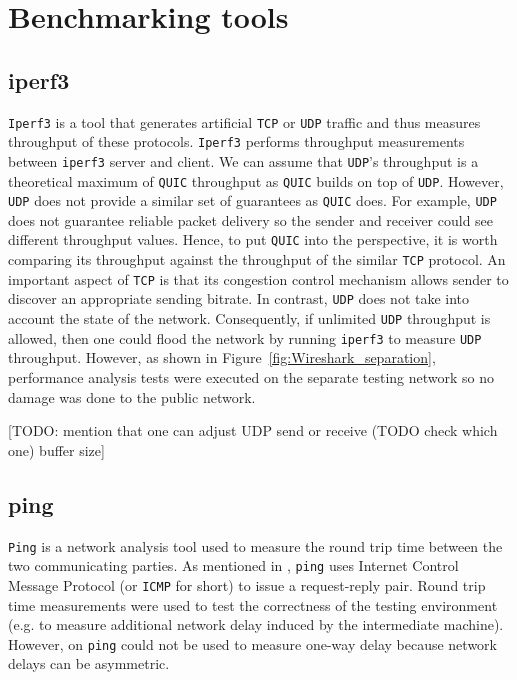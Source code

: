 \documentclass[12pt,a4paper,twoside,openright]{report}
\begin{document}
\section{Benchmarking tools}
\subsection{iperf3}
\texttt{Iperf3} is a tool that generates artificial \texttt{TCP} or \texttt{UDP} traffic and thus measures throughput of these protocols.
\texttt{Iperf3} performs throughput measurements between \texttt{iperf3} server and client.
We can assume that \texttt{UDP}'s throughput is a theoretical maximum of \texttt{QUIC} throughput as \texttt{QUIC} builds on top of \texttt{UDP}.
However, \texttt{UDP} does not provide a similar set of guarantees as \texttt{QUIC} does.
For example, \texttt{UDP} does not guarantee reliable packet delivery so the sender and receiver could see different throughput values.
Hence, to put \texttt{QUIC} into the perspective, it is worth comparing its throughput against the throughput of the similar \texttt{TCP} protocol.
An important aspect of \texttt{TCP} is that its congestion control mechanism allows sender to discover an appropriate sending bitrate.
In contrast, \texttt{UDP} does not take into account the state of the network.
Consequently, if unlimited \texttt{UDP} throughput is allowed, then one could flood the network by running \texttt{iperf3} to measure \texttt{UDP} throughput.
However, as shown in Figure~\ref{fig:Wireshark_separation}, performance analysis tests were executed on the separate testing network so no damage was done to the public network.


[TODO: mention that one can adjust UDP send or receive (TODO check which one) buffer size]



\subsection{ping}
\texttt{Ping} is a network analysis tool used to measure the round trip time between the two communicating parties.
As mentioned in \cite{internet-control-message-protocol-icmp}, \texttt{ping} uses Internet Control Message Protocol (or \texttt{ICMP} for short) to issue a request-reply pair.
Round trip time measurements were used to test the correctness of the testing environment (e.g. to measure additional network delay induced by the intermediate machine).
However, on \texttt{ping} could not be used to measure one-way delay because network delays can be asymmetric.
\end{document}
